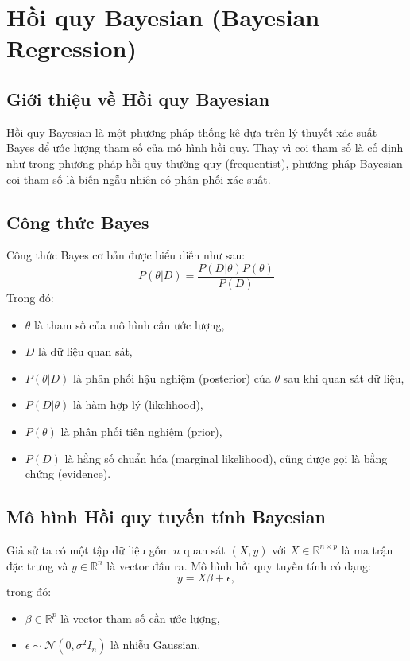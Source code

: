 \chapter{Hồi quy Bayesian (Bayesian Regression)}

\section{Giới thiệu về Hồi quy Bayesian}
Hồi quy Bayesian là một phương pháp thống kê dựa trên lý thuyết xác suất Bayes để ước lượng tham số của mô hình hồi quy. Thay vì coi tham số là cố định như trong phương pháp hồi quy thường quy (frequentist), phương pháp Bayesian coi tham số là biến ngẫu nhiên có phân phối xác suất.

\section{Công thức Bayes}
Công thức Bayes cơ bản được biểu diễn như sau:
\begin{equation}
    P(\theta | D) = \frac{P(D | \theta) P(\theta)}{P(D)}
\end{equation}
Trong đó:
\begin{itemize}
    \item $\theta$ là tham số của mô hình cần ước lượng,
    \item $D$ là dữ liệu quan sát,
    \item $P(\theta | D)$ là phân phối hậu nghiệm (posterior) của $\theta$ sau khi quan sát dữ liệu,
    \item $P(D | \theta)$ là hàm hợp lý (likelihood),
    \item $P(\theta)$ là phân phối tiên nghiệm (prior),
    \item $P(D)$ là hằng số chuẩn hóa (marginal likelihood), cũng được gọi là bằng chứng (evidence).
\end{itemize}

\section{Mô hình Hồi quy tuyến tính Bayesian}
Giả sử ta có một tập dữ liệu gồm $n$ quan sát $(X, y)$ với $X \in \mathbb{R}^{n \times p}$ là ma trận đặc trưng và $y \in \mathbb{R}^n$ là vector đầu ra. Mô hình hồi quy tuyến tính có dạng:
\begin{equation}
    y = X \beta + \epsilon,
\end{equation}
trong đó:
\begin{itemize}
    \item $\beta \in \mathbb{R}^p$ là vector tham số cần ước lượng,
    \item $\epsilon \sim \mathcal{N}(0, \sigma^2 I_n)$ là nhiễu Gaussian.
\end{itemize}


